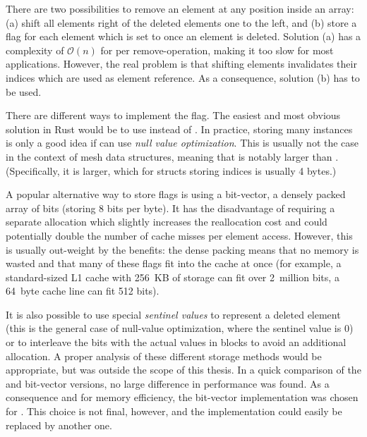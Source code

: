 There are two possibilities to remove an element at any position inside an array: (a) shift all elements right of the deleted elements one to the left, and (b) store a  flag for each element which is set to  once an element is deleted.
Solution (a) has a complexity of $\mathcal O(n)$ for per remove-operation, making it too slow for most applications.
However, the real problem is that shifting elements invalidates their indices which are used as element reference.
As a consequence, solution (b) has to be used.

There are different ways to implement the  flag.
The easiest and most obvious solution in Rust would be to use  instead of .
In practice, storing many  instances is only a good idea if  can use \emph{null value optimization}.
This is usually not the case in the context of mesh data structures, meaning that  is notably larger than .
(Specifically, it is  larger, which for structs storing  indices is usually 4 bytes.)


A popular alternative way to store  flags is using a bit-vector, a densely packed array of bits (storing 8 bits per byte).
It has the disadvantage of requiring a separate allocation which slightly increases the reallocation cost and could potentially double the number of cache misses per element access.
However, this is usually out-weight by the benefits:
the dense packing means that no memory is wasted and that many of these flags fit into the cache at once (for example, a standard-sized L1 cache with 256~KB of storage can fit over 2~million bits, a 64~byte cache line can fit 512 bits).

It is also possible to use special \emph{sentinel values} to represent a deleted element (this is the general case of null-value optimization, where the sentinel value is 0) or to interleave the bits with the actual values in blocks to avoid an additional allocation.
A proper analysis of these different storage methods would be appropriate, but was outside the scope of this thesis.
In a quick comparison of the  and bit-vector versions, no large difference in performance was found.
As a consequence and for memory efficiency, the bit-vector implementation was chosen for .
This choice is not final, however, and the implementation could easily be replaced by another one.

